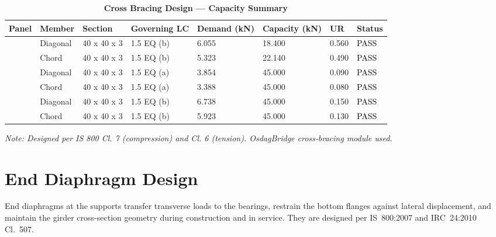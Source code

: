 \documentclass[12pt,a4paper]{report}
\numberwithin{table}{chapter}
\numberwithin{figure}{chapter}
\begin{document}
\vspace{1em}
\begin{longtable}{|C{2.0cm}|L{1.8cm}|C{2.2cm}|C{3.0cm}|C{1.8cm}|C{1.8cm}|C{1.2cm}|C{1.8cm}|}
\caption{\textbf{Cross Bracing Design --- Capacity Summary}}
\hline
\textbf{Panel} & \textbf{Member} & \textbf{Section} & \textbf{Governing LC} & \textbf{Demand (kN)} & \textbf{Capacity (kN)} & \textbf{UR} & \textbf{Status} \\[6pt]
\hline
{} & Diagonal & 40 x 40 x 3 & 1.5 EQ (b) & 6.055 & 18.400 & 0.560 & \textcolor{black}{PASS} \\[6pt]
 & Chord & 40 x 40 x 3 & 1.5 EQ (b) & 5.323 & 22.140 & 0.490 & \textcolor{black}{PASS} \\[6pt]
\hline
{} & Diagonal & 40 x 40 x 3 & 1.5 EQ (a) & 3.854 & 45.000 & 0.090 & \textcolor{black}{PASS} \\[6pt]
 & Chord & 40 x 40 x 3 & 1.5 EQ (a) & 3.388 & 45.000 & 0.080 & \textcolor{black}{PASS} \\[6pt]
\hline
{} & Diagonal & 40 x 40 x 3 & 1.5 EQ (b) & 6.738 & 45.000 & 0.150 & \textcolor{black}{PASS} \\[6pt]
 & Chord & 40 x 40 x 3 & 1.5 EQ (b) & 5.923 & 45.000 & 0.130 & \textcolor{black}{PASS} \\[6pt]
\hline
\end{longtable}
\noindent\textit{Note: Designed per IS 800 Cl. 7 (compression) and Cl. 6 (tension). OsdagBridge cross-bracing module used.}

\section{End Diaphragm Design}
\label{sec:end-diaphragm}

End diaphragms at the supports transfer transverse loads to the bearings, restrain the bottom flanges against lateral displacement, and maintain the girder cross-section geometry during construction and in service. They are designed per IS~800:2007 and IRC~24:2010 Cl.~507.

\vspace{1em}

\vspace{0.4em}
\noindent
\setlength{\tabcolsep}{4pt}
\setlength{\LTleft}{0pt}
\setlength{\LTright}{\fill}
\end{document}
